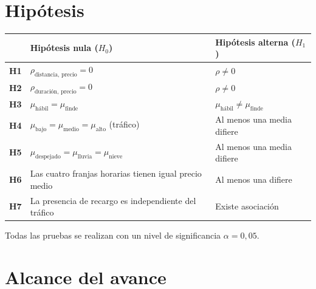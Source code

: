 \documentclass[
]{book}
\begin{document}
\section*{Hipótesis}\label{hipuxf3tesis}

\begin{longtable}[]{@{}
  >{\raggedright\arraybackslash}p{}
  >{\raggedright\arraybackslash}p{}
  >{\raggedright\arraybackslash}p{}@{}}
\toprule\noalign{}
\begin{minipage}[b]{\linewidth}\raggedright
\end{minipage} & \begin{minipage}[b]{\linewidth}\raggedright
Hipótesis nula (\(H_0\))
\end{minipage} & \begin{minipage}[b]{\linewidth}\raggedright
Hipótesis alterna (\(H_1\))
\end{minipage} \\
\midrule\noalign{}
\endhead
\bottomrule\noalign{}
\endlastfoot
\textbf{H1} & \(\rho_{\text{distancia, precio}} = 0\) & \(\rho \neq 0\) \\
\textbf{H2} & \(\rho_{\text{duración, precio}} = 0\) & \(\rho \neq 0\) \\
\textbf{H3} & \(\mu_{\text{hábil}} = \mu_{\text{finde}}\) & \(\mu_{\text{hábil}} \neq \mu_{\text{finde}}\) \\
\textbf{H4} & \(\mu_{\text{bajo}} = \mu_{\text{medio}} = \mu_{\text{alto}}\) (tráfico) & Al menos una media difiere \\
\textbf{H5} & \(\mu_{\text{despejado}} = \mu_{\text{lluvia}} = \mu_{\text{nieve}}\) & Al menos una media difiere \\
\textbf{H6} & Las cuatro franjas horarias tienen igual precio medio & Al menos una difiere \\
\textbf{H7} & La presencia de recargo es independiente del tráfico & Existe asociación \\
\end{longtable}

Todas las pruebas se realizan con un nivel de significancia \(\alpha = 0{,}05\).

\section*{Alcance del avance}\label{alcance-del-avance}
\end{document}
